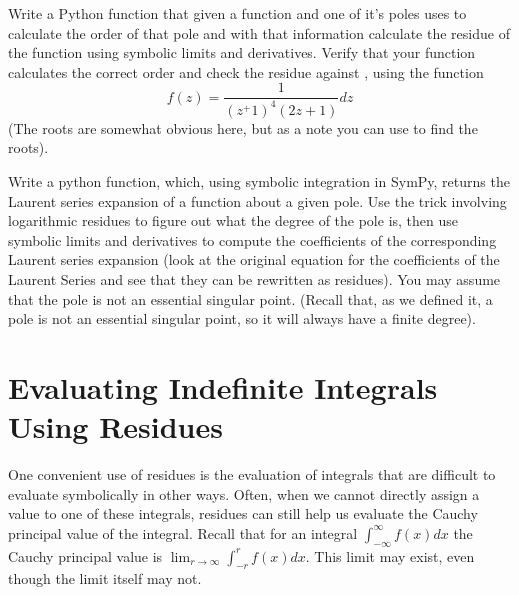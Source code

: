 \begin{problem}
Write a Python function that given a function and one of it's poles uses  to calculate the order of that pole and with that information calculate the residue of the function using symbolic limits and derivatives.
Verify that your function calculates the correct order and check the residue against , using the function
\[f(z) = \frac{1}{(z^+1)^{4}(2z+1)}dz\]
(The roots are somewhat obvious here, but as a note you can use  to find the roots).
\end{problem}

\begin{problem}
Write a python function, which, using symbolic integration in SymPy, returns the Laurent series expansion of a function about a given pole.
Use the trick involving logarithmic residues to figure out what the degree of the pole is, then use symbolic limits and derivatives to compute the coefficients of the corresponding Laurent series expansion (look at the original equation for the coefficients of the Laurent Series and see that they can be rewritten as residues).
You may assume that the pole is not an essential singular point.
(Recall that, as we defined it, a pole is not an essential singular point, so it will always have a finite degree).
\end{problem}

\section*{Evaluating Indefinite Integrals Using Residues}

One convenient use of residues is the evaluation of integrals that are difficult to evaluate symbolically in other ways.
Often, when we cannot directly assign a value to one of these integrals, residues can still help us evaluate the Cauchy principal value of the integral.
Recall that for an integral $\int_{-\infty}^{\infty} f(x)dx$ the Cauchy principal value is $\lim_{r\to \infty} \int_{-r}^{r} f(x) dx$.
This limit may exist, even though the limit itself may not.

